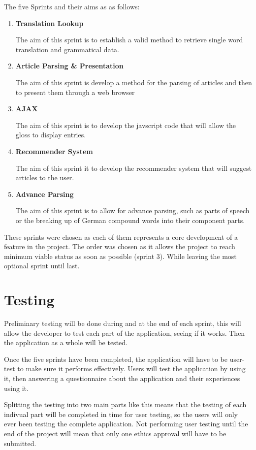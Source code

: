 The five Sprints and their aims as as follows:
\begin{enumerate}
	\item \textbf{Translation Lookup}
	
	The aim of this sprint is to establish a valid method to retrieve single word translation and grammatical data.
	
	\item \textbf{Article Parsing \& Presentation}
	
	The aim of this sprint is develop a method for the parsing of articles and then to present them through a web browser
	
	\item \textbf{AJAX}
	
	The aim of this sprint is to develop the javscript code that will allow the gloss to display entries.
	
	\item \textbf{Recommender System}
	
	The aim of this sprint it to develop the recommender system that will suggest articles to the user. 
	
	\item \textbf{Advance Parsing}
	
	The aim of this sprint is to allow for advance parsing, such as parts of speech or the breaking up of German compound words into their component parts.
\end{enumerate}

These sprints were chosen as each of them represents a core development of a feature in the project. The order was chosen as it allows the project to reach minimum viable status as soon as possible (sprint 3). While leaving the most optional sprint until last.  

\section{Testing}
Preliminary testing will be done during and at the end of each sprint, this will allow the developer to test each part of the application, seeing if it works. Then the application as a whole will be tested. 

Once the five sprints have been completed, the application will have to be user-test to make sure it performs effectively. Users will test the application by using it, then answering a questionnaire about the application and their experiences using it. 

Splitting the testing into two main parts like this means that the testing of each indivual part will be completed in time for user testing, so the users will only ever been testing the complete application. Not performing user testing until the end of the project will mean that only one ethics approval will have to be submitted. 